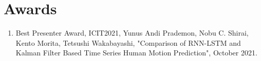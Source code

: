 

\chapter*{Awards} %



\ifpdf
    \graphicspath{{8/figures/PNG/}{8/figures/PDF/}{8/figures/}}
\else
    \graphicspath{{8/figures/EPS/}{8/figures/}}
\fi

\begin{enumerate}
    \item Best Presenter Award, ICIT2021, Yunus Andi Prademon, Nobu C. Shirai, Kento Morita, Tetsushi Wakabayashi, "Comparison of RNN-LSTM and Kalman Filter Based Time Series Human Motion Prediction", October 2021.
\end{enumerate}



 




 






